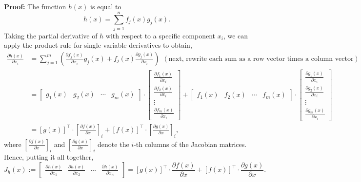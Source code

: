\textbf{Proof:}
The function $h(x)$ is equal to
$$h(x) = \sum_{j=1}^{n} f_j(x) g_j(x). $$ 
Taking the partial derivative of \( h \) with respect to a specific component \( x_i \), we can apply the product rule for single-variable derivatives to obtain,
\begin{align*}
    \frac{\partial h(x)}{\partial x_i} &= \sum_{j=1}^{m} \left( \frac{\partial f_j(x)}{\partial x_i} g_j(x) + f_j(x) \frac{\partial g_j(x)}{\partial x_i} \right) ~~(\text{next, rewrite each sum as a row vector times a column vector}) \\[1em]
    & = \left[ \begin{array}{cccc} g_1(x)  & g_2(x) & \cdots &g_m(x)  \end{array} \right] \cdot \left[ \begin{array}{c} \frac{\partial f_1(x)}{\partial x_i}  \\ \frac{\partial f_2(x)}{\partial x_i}   \\ \vdots \\ \frac{\partial f_m(x)}{\partial x_i} \end{array} \right]  + 
     \left[ \begin{array}{cccc} f_1(x) & f_2(x) & \cdots & f_m(x)  \end{array} \right] \cdot  \left[ \begin{array}{c} \frac{\partial g_1(x)}{\partial x_i}  \\ \frac{\partial g_2(x)}{\partial x_i}  \\ \vdots  \\  \frac{\partial g_m(x)}{\partial x_i} \end{array} \right] \\[1em]
     & = \left[g(x) \right]^\top \cdot \left[ \frac{\partial f(x)}{\partial x}   \right]_i  + \left[f(x)\right]^\top \cdot \left[ \frac{\partial g(x)}{\partial x}   \right]_i ,
\end{align*}
 where $\left[ \frac{\partial f(x)}{\partial x}   \right]_i $  and $\left[ \frac{\partial g(x)}{\partial x}   \right]_i$ denote the \(i\)-th columns of the Jacobian matrices. Hence, putting it all together,
$$
J_h(x) := \left[ \begin{array}{cccc} \frac{\partial h(x)}{\partial x_1}  & \frac{\partial h(x)}{\partial x_2} & \cdots & \frac{\partial h(x)}{\partial x_n} \end{array} \right] = \left[g(x)\right]^\top \cdot\frac{\partial f(x)}{\partial x}  + \left[f(x)\right]^\top \cdot\frac{\partial g(x)}{\partial x}.
$$


